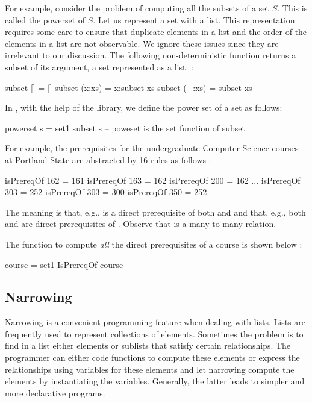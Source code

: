 For example, consider the problem of computing all the subsets
of a set $S$.  This is called the powerset of $S$. 
Let us represent a set with a list.
This representation requires some care to ensure that
duplicate elements in a list and
the order of the elements in a list are not observable.
We ignore these issues since they are irrelevant to our discussion.
The following non-deterministic function returns a
subset of its argument, a set represented as a list:
:
%
\begin{prog}
subset []     = []
subset (x:xs) = x:subset xs
subset (_:xs) =   subset xs
\end{prog}
%
In \pakcs{}, with the help of the  library,
we define the power set of a set as follows:
%
\begin{prog}
powerset s = set1 subset s  -- poweset is the set function of subset
\end{prog}
%
For example, the prerequisites for the undergraduate 
Computer Science courses at Portland State
are abstracted by 16 rules as follows
:
%
\begin{prog}
isPrereqOf 162 = 161
isPrereqOf 163 = 162
isPrereqOf 200 = 162
...
isPrereqOf 303 = 252
isPrereqOf 303 = 300
isPrereqOf 350 = 252
\end{prog}
%
The meaning is that, e.g.,  is a direct prerequisite of both
 and  and that, e.g., 
both  and  are direct prerequisites of .
Observe that  is a many-to-many relation.

The function to compute \emph{all} the direct prerequisites
of a course is shown below
:
%
\begin{prog}
 course = set1 IsPrereqOf course
\end{prog}
%


\subsection{Narrowing}

Narrowing is a convenient programming feature when dealing with lists.
Lists are frequently used to represent collections of elements.
Sometimes the problem is to find in a list either elements
or sublists that satisfy certain relationships.
The programmer can either code functions to compute these elements
or express the relationships using variables for these elements
and let narrowing compute the elements by instantiating the variables.
Generally, the latter leads to simpler and more declarative programs.

